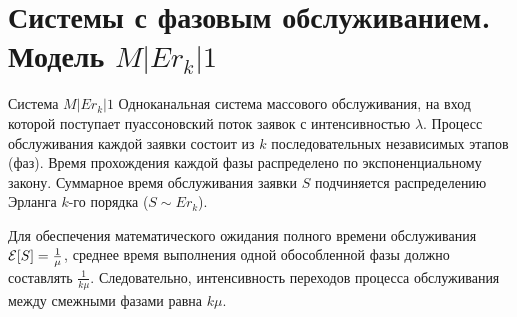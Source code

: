 \section{Системы с фазовым обслуживанием. Модель $M|Er_k|1$}

\begin{definition}{Система $M|Er_k|1$}
Одноканальная система массового обслуживания, на вход которой поступает пуассоновский поток заявок с интенсивностью $\lambda$. Процесс обслуживания каждой заявки состоит из $k$ последовательных независимых этапов (фаз). Время прохождения каждой фазы распределено по экспоненциальному закону. Суммарное время обслуживания заявки $S$ подчиняется распределению Эрланга $k$-го порядка ($S \sim Er_k$).
\end{definition}

Для обеспечения математического ожидания полного времени обслуживания $\mathcal{E}[S] = \frac{1}{\mu}$, среднее время выполнения одной обособленной фазы должно составлять $\frac{1}{k\mu}$. Следовательно, интенсивность переходов процесса обслуживания между смежными фазами равна $k\mu$.

